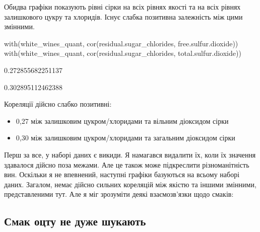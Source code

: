 \documentclass[
  letterpaper,
  DIV=11,
  numbers=noendperiod]{scrreprt}
\newenvironment{Shaded}{\begin{snugshade}}{\end{snugshade}}
\newcommand{\FunctionTok}[1]{\textcolor[rgb]{0.28,0.35,0.67}{#1}}
\newcommand{\NormalTok}[1]{\textcolor[rgb]{0.00,0.23,0.31}{#1}}
\providecommand{\tightlist}{%
  \setlength{\itemsep}{0pt}\setlength{\parskip}{0pt}}\usepackage{longtable,booktabs,array}
\begin{document}
Обидва графіки показують рівні сірки на всіх рівнях якості та на всіх
рівнях залишкового цукру та хлоридів. Існує слабка позитивна залежність
між цими змінними.

\begin{Shaded}
\begin{Highlighting}[]
\FunctionTok{with}\NormalTok{(white\_wines\_quant, }\FunctionTok{cor}\NormalTok{(residual.sugar\_chlorides, free.sulfur.dioxide))}
\FunctionTok{with}\NormalTok{(white\_wines\_quant, }\FunctionTok{cor}\NormalTok{(residual.sugar\_chlorides, total.sulfur.dioxide))}
\end{Highlighting}
\end{Shaded}

0.272855682251137

0.302895112462388

Кореляції дійсно слабко позитивні:

\begin{itemize}
\tightlist
\item
  0,27 між залишковим цукром/хлоридами та вільним діоксидом сірки
\item
  0,30 між залишковим цукром/хлоридами та загальним діоксидом сірки
\end{itemize}

Перш за все, у наборі даних є викиди. Я намагався видалити їх, коли їх
значення здавалося дійсно поза межами. Але це також може підкреслити
різноманітність вин. Оскільки я не впевнений, наступні графіки базуються
на всьому наборі даних. Загалом, немає дійсно сильних кореляцій між
якістю та іншими змінними, представленими тут. Але я міг зрозуміти деякі
взаємозв'язки щодо смаків:

\subsection{Смак оцту не дуже
шукають}\label{ux441ux43cux430ux43a-ux43eux446ux442ux443-ux43dux435-ux434ux443ux436ux435-ux448ux443ux43aux430ux44eux442ux44c}
\end{document}
